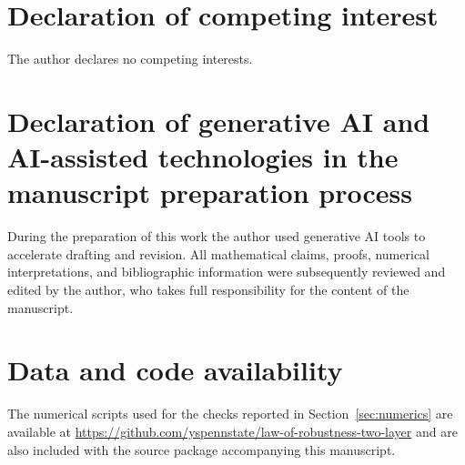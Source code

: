 \documentclass[11pt,reqno]{amsart}
\theoremstyle{plain}
\theoremstyle{definition}
\theoremstyle{remark}
\begin{document}
\section*{Declaration of competing interest}
The author declares no competing interests.

\section*{Declaration of generative AI and AI-assisted technologies in the manuscript preparation process}
During the preparation of this work the author used generative AI tools to accelerate drafting and revision. All mathematical claims, proofs, numerical interpretations, and bibliographic information were subsequently reviewed and edited by the author, who takes full responsibility for the content of the manuscript.

\section*{Data and code availability}
The numerical scripts used for the checks reported in Section~\ref{sec:numerics} are available at \url{https://github.com/yspennstate/law-of-robustness-two-layer} and are also included with the source package accompanying this manuscript.
\end{document}
